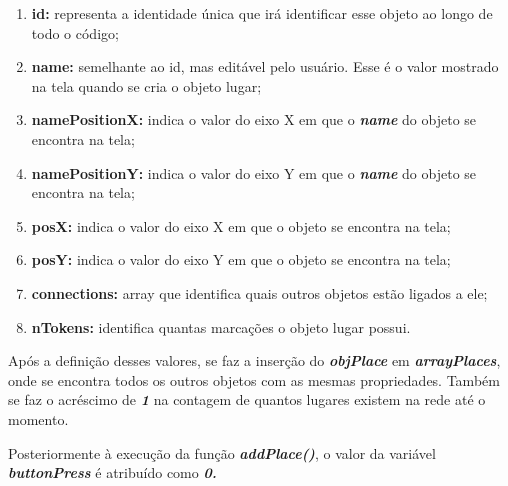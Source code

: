 \documentclass[
	12pt,				%
	openright,			%
	oneside,			%
	a4paper,			%
	english,			%
	brazil				%
	]{abntex2}
\theoremstyle{doispontos}
\begin{document}
\begin{enumerate}
	\item \textbf{id:} representa a identidade única que irá identificar esse objeto ao longo de todo o código;
	\item \textbf{name:} semelhante ao id, mas editável pelo usuário. Esse é o valor mostrado na tela quando se cria o objeto lugar;
	\item \textbf{namePositionX:} indica o valor do eixo X em que o \textbf{\textit{name}} do objeto se encontra na tela;
	\item \textbf{namePositionY:} indica o valor do eixo Y em que o \textbf{\textit{name}} do objeto se encontra na tela;
	\item \textbf{posX:} indica o valor do eixo X em que o objeto se encontra na tela;
	\item \textbf{posY:} indica o valor do eixo Y em que o objeto se encontra na tela;
	\item \textbf{connections:} array que identifica quais outros objetos estão ligados a ele;\label{prop:connections}
	\item \textbf{nTokens:} identifica quantas marcações o objeto lugar possui.
\end{enumerate}

Após a definição desses valores, se faz a inserção do \textbf{\textit{objPlace}} em \textbf{\textit{arrayPlaces}}, onde se encontra todos os outros objetos com as mesmas propriedades. Também se faz o acréscimo de \textbf{\textit{1}} na contagem de quantos lugares existem na rede até o momento.



Posteriormente à execução da função \textbf{\textit{addPlace()}}, o valor da variável \textbf{\textit{buttonPress}} é atribuído como \textbf{\textit{0.}}
\end{document}
